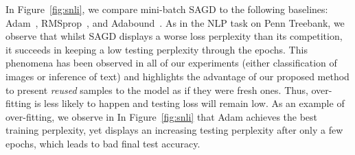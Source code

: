 In Figure~\ref{fig:snli}, we compare mini-batch SAGD to the following baselines: Adam~\citep{kiba15},  RMSprop~\citep{tige12}, and Adabound~\citep{luxi2019}. 
As in the NLP task on Penn Treebank, we observe that whilst SAGD displays a worse loss perplexity than its competition, it succeeds in keeping a low testing perplexity through the epochs.
This phenomena has been observed in all of our experiments (either classification of images or inference of text) and highlights the advantage of our proposed method to present \emph{reused} samples to the model as if they were fresh ones. 
Thus, over-fitting is less likely to happen and testing loss will remain low.
As an example of over-fitting, we observe in In Figure~\ref{fig:snli} that Adam achieves the best training perplexity, yet displays an increasing testing perplexity after only a few epochs, which leads to bad final test accuracy.